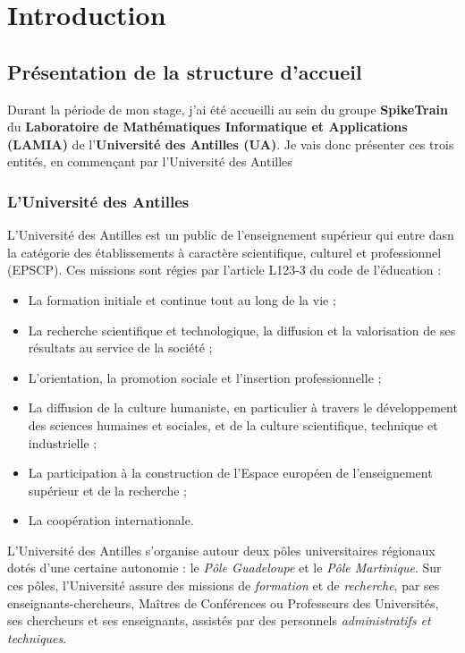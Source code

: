 \hypertarget{Introduction}{%
\chapter{Introduction}\label{Introduction}}


\section{Présentation de la structure
d'accueil}

Durant la période de mon stage, j'ai été accueilli au sein du groupe \textbf{SpikeTrain} du
\textbf{Laboratoire de Mathématiques Informatique et Applications
(LAMIA)} de l'\textbf{Université des Antilles (UA)}.
Je vais donc présenter ces trois entités, en commençant par l'Université des Antilles

\hypertarget{lUniversite-des-antilles}{%
\subsection{L'Université des Antilles}\label{luniversite-des-antilles}}

L'Université des Antilles est un public de l'enseignement supérieur qui entre dasn la catégorie des établissements à  caractère scientifique, culturel et professionnel (EPSCP).
Ces missions sont régies par l'article L123-3 du code de l'éducation :
\begin{itemize}
\item La formation initiale et continue tout au long de la vie ;
\item La recherche scientifique et technologique, la diffusion et la valorisation de ses résultats au service de la société ;
\item L’orientation, la promotion sociale et l’insertion professionnelle ;
\item La diffusion de la culture humaniste, en particulier à travers le développement des sciences humaines et sociales, et de la culture scientifique, technique et industrielle ;
\item La participation à la construction de l’Espace européen de l’enseignement supérieur et de la recherche ;
\item La coopération internationale.
\end{itemize}

L'Université des Antilles s'organise autour deux pôles universitaires
régionaux dotés d'une certaine autonomie : le \textit{Pôle Guadeloupe} et le \textit{Pôle Martinique}.
Sur ces pôles, l'Université assure des missions de \emph{formation} et
de \emph{recherche}, par ses enseignants-chercheurs, Maîtres de Conférences ou Professeurs des Universités, ses chercheurs et ses enseignants, assistés par des personnels \emph{administratifs et
techniques}.

